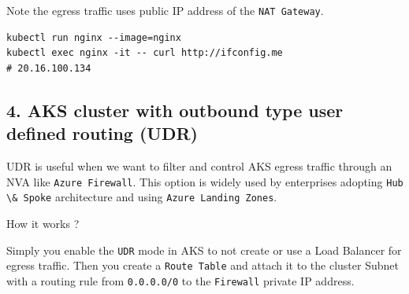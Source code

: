 \documentclass[
]{article}
\newcommand{\passthrough}[1]{#1}
\begin{document}
Note the egress traffic uses public IP address of the
\passthrough{\lstinline!NAT Gateway!}.

\begin{lstlisting}
kubectl run nginx --image=nginx
kubectl exec nginx -it -- curl http://ifconfig.me
# 20.16.100.134
\end{lstlisting}

\hypertarget{aks-cluster-with-outbound-type-user-defined-routing-udr}{%
\subsection{4. AKS cluster with outbound type user defined routing
(UDR)}\label{aks-cluster-with-outbound-type-user-defined-routing-udr}}

UDR is useful when we want to filter and control AKS egress traffic
through an NVA like \passthrough{\lstinline!Azure Firewall!}. This
option is widely used by enterprises adopting
\passthrough{\lstinline!Hub \& Spoke!} architecture and using
\passthrough{\lstinline!Azure Landing Zones!}.

How it works ?

Simply you enable the \passthrough{\lstinline!UDR!} mode in AKS to not
create or use a Load Balancer for egress traffic. Then you create a
\passthrough{\lstinline!Route Table!} and attach it to the cluster
Subnet with a routing rule from \passthrough{\lstinline!0.0.0.0/0!} to
the \passthrough{\lstinline!Firewall!} private IP address.
\end{document}
